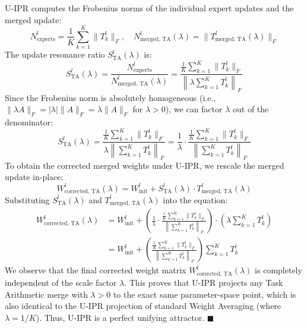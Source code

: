 \documentclass{article}
\begin{document}
U-IPR computes the Frobenius norms of the individual expert updates and the merged update:
\begin{equation}
    N_{\text{experts}}^l = \frac{1}{K} \sum_{k=1}^K \|T_k^l\|_F, \quad N_{\text{merged, TA}}^l(\lambda) = \|T_{\text{merged, TA}}^l(\lambda)\|_F
\end{equation}
The update resonance ratio $S_{\text{TA}}^l(\lambda)$ is:
\begin{equation}
    S_{\text{TA}}^l(\lambda) = \frac{N_{\text{experts}}^l}{N_{\text{merged, TA}}^l(\lambda)} = \frac{\frac{1}{K} \sum_{k=1}^K \|T_k^l\|_F}{\left\| \lambda \sum_{k=1}^K T_k^l \right\|_F}
\end{equation}
Since the Frobenius norm is absolutely homogeneous (i.e., $\|\lambda A\|_F = |\lambda| \|A\|_F = \lambda \|A\|_F$ for $\lambda > 0$), we can factor $\lambda$ out of the denominator:
\begin{equation}
    S_{\text{TA}}^l(\lambda) = \frac{\frac{1}{K} \sum_{k=1}^K \|T_k^l\|_F}{\lambda \left\| \sum_{k=1}^K T_k^l \right\|_F} = \frac{1}{\lambda} \cdot \frac{\frac{1}{K} \sum_{k=1}^K \|T_k^l\|_F}{\left\| \sum_{k=1}^K T_k^l \right\|_F}
\end{equation}
To obtain the corrected merged weights under U-IPR, we rescale the merged update in-place:
\begin{equation}
    W_{\text{corrected, TA}}^l(\lambda) = W_{\text{init}}^l + S_{\text{TA}}^l(\lambda) \cdot T_{\text{merged, TA}}^l(\lambda)
\end{equation}
Substituting $S_{\text{TA}}^l(\lambda)$ and $T_{\text{merged, TA}}^l(\lambda)$ into the equation:
\begin{align}
    W_{\text{corrected, TA}}^l(\lambda) &= W_{\text{init}}^l + \left( \frac{1}{\lambda} \cdot \frac{\frac{1}{K} \sum_{k=1}^K \|T_k^l\|_F}{\left\| \sum_{k=1}^K T_k^l \right\|_F} \right) \cdot \left( \lambda \sum_{k=1}^K T_k^l \right) \\
    &= W_{\text{init}}^l + \left( \frac{\frac{1}{K} \sum_{k=1}^K \|T_k^l\|_F}{\left\| \sum_{k=1}^K T_k^l \right\|_F} \right) \sum_{k=1}^K T_k^l
\end{align}
We observe that the final corrected weight matrix $W_{\text{corrected, TA}}^l(\lambda)$ is completely independent of the scale factor $\lambda$. This proves that U-IPR projects any Task Arithmetic merge with $\lambda > 0$ to the exact same parameter-space point, which is also identical to the U-IPR projection of standard Weight Averaging (where $\lambda = 1/K$). Thus, U-IPR is a perfect unifying attractor. $\blacksquare$
\end{document}
